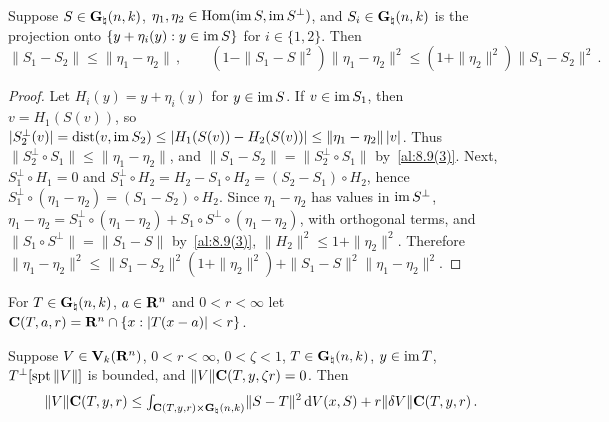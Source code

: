 \begin{lemma}
    \label{al:8.9(5)}
    Suppose $S \in \mathbf{G}_{\natural}(n,k)$, $\eta_1, \eta_2 \in \operatorname{Hom}(\operatorname{im} S, \operatorname{im} S^\perp)$, and $S_i
    \in \mathbf{G}_{\natural}(n,k)$ is the projection onto $\{ y + \eta_i(y) : y \in \operatorname{im} S \}$ for $i \in
    \{1,2\}$. Then
    \begin{displaymath}
        \|S_1 - S_2\| \le \|\eta_1 - \eta_2\| \,, \qquad (1 - \|S_1 - S\|^2) \|\eta_1 - \eta_2\|^2
        \le (1 + \|\eta_2\|^2) \|S_1 - S_2\|^2 \,.
    \end{displaymath}
\end{lemma}

\begin{proof}
    Let $H_i(y) = y + \eta_i(y)$ for $y \in \operatorname{im} S$. If $v \in \operatorname{im} S_1$, then $v = H_1(S(v))$, so
    $|S_2^\perp(v)| = \operatorname{dist}(v, \operatorname{im} S_2) \le |H_1(S(v)) - H_2(S(v))| \le \|\eta_1 - \eta_2\| \, |v|$.
    Thus $\|S_2^\perp \circ S_1\| \le \|\eta_1 - \eta_2\|$, and $\|S_1 - S_2\| = \|S_2^\perp \circ
    S_1\|$ by~\ref{al:8.9(3)}. Next, $S_1^\perp \circ H_1 = 0$ and $S_1^\perp \circ H_2 = H_2 - S_1
    \circ H_2 = (S_2 - S_1) \circ H_2$, hence $S_1^\perp \circ (\eta_1 - \eta_2) = (S_1 - S_2) \circ
    H_2$. Since $\eta_1 - \eta_2$ has values in $\operatorname{im} S^\perp$, $\eta_1 - \eta_2 = S_1^\perp \circ
    (\eta_1 - \eta_2) + S_1 \circ S^\perp \circ (\eta_1 - \eta_2)$, with orthogonal terms, and
    $\|S_1 \circ S^\perp\| = \|S_1 - S\|$ by~\ref{al:8.9(3)}, $\|H_2\|^2 \le 1 + \|\eta_2\|^2$.
    Therefore $\|\eta_1 - \eta_2\|^2 \le \|S_1 - S_2\|^2 (1 + \|\eta_2\|^2) + \|S_1 - S\|^2
    \|\eta_1 - \eta_2\|^2$.
\end{proof}

\begin{definition}
    \label{al:8.10}
    For $T \in \mathbf{G}_{\natural}(n,k)$, $a \in \mathbf{R}^{n}$ and $0 < r < \infty$ let
    $\mathbf{C} ( T, a, r ) = \mathbf{R}^{n} \cap \{ x : |T(x - a)| < r \}$.
\end{definition}

\begin{lemma}
    \label{al:8.11}
    Suppose $V \in \mathbf{V}_{k}(\mathbf{R}^{n})$, $0 < r < \infty$, $0 < \zeta < 1$, $T \in
    \mathbf{G}_{\natural}(n,k)$, $y \in \operatorname{im} T$, $T^\perp[\operatorname{spt} \|V\|]$ is bounded, and $\|V\|
    \mathbf{C} ( T, y, \zeta r ) = 0$. Then
    \begin{displaymath}
        [\zeta(\vdim+1) - \vdim] \, \|V\| \cylind{T}{y}{r} \le \textint{\cylind{T}{y}{r} \times
        \pgrass{\adim}{\vdim}}{} \|S - T\|^2 \ud V(x,S) + r \|\delta V\| \cylind{T}{y}{r} \,.
    \end{displaymath}
\end{lemma}

